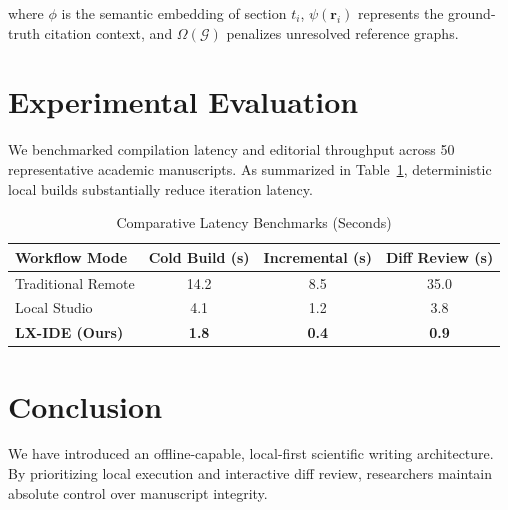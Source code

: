 \documentclass[11pt,a4paper]{article}
\begin{document}
where $\phi$ is the semantic embedding of section $t_i$, $\psi(\mathbf{r}_i)$ represents the ground-truth citation context, and $\Omega(\mathcal{G})$ penalizes unresolved reference graphs.

\section{Experimental Evaluation}
\label{sec:experiments}
We benchmarked compilation latency and editorial throughput across 50 representative academic manuscripts. As summarized in Table~\ref{tab:results}, deterministic local builds substantially reduce iteration latency.

\begin{table}[htbp]
\centering
\caption{Comparative Latency Benchmarks (Seconds)}
\label{tab:results}
\begin{tabular}{lccc}
\toprule
\textbf{Workflow Mode} & \textbf{Cold Build (s)} & \textbf{Incremental (s)} & \textbf{Diff Review (s)} \\
\midrule
Traditional Remote & 14.2 & 8.5 & 35.0 \\
Local Studio & 4.1 & 1.2 & 3.8 \\
\textbf{LX-IDE (Ours)} & \textbf{1.8} & \textbf{0.4} & \textbf{0.9} \\
\bottomrule
\end{tabular}
\end{table}

\section{Conclusion}
\label{sec:conclusion}
We have introduced an offline-capable, local-first scientific writing architecture. By prioritizing local execution and interactive diff review, researchers maintain absolute control over manuscript integrity.



\end{document}
